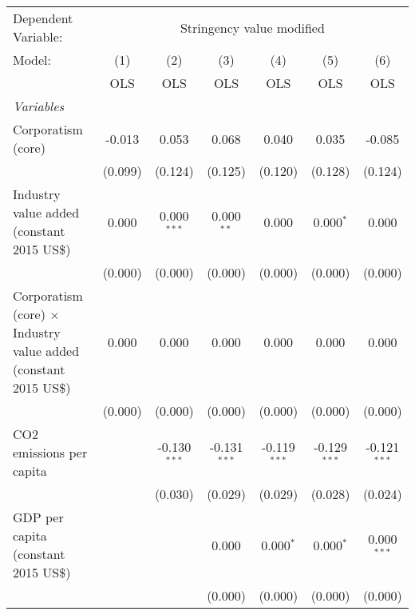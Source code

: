 
\begingroup
\centering
\begin{tabular}{lcccccc}
   \toprule
   Dependent Variable: & \multicolumn{6}{c}{Stringency value modified}\\
   Model:                                                                  & (1)     & (2)            & (3)            & (4)            & (5)            & (6)\\  
                                                                           &  OLS    & OLS            & OLS            & OLS            & OLS            & OLS\\  
   \midrule
   \emph{Variables}\\
   Corporatism (core)                                                      & -0.013  & 0.053          & 0.068          & 0.040          & 0.035          & -0.085\\   
                                                                           & (0.099) & (0.124)        & (0.125)        & (0.120)        & (0.128)        & (0.124)\\   
   Industry value added (constant 2015 US\$)                               & 0.000   & 0.000$^{***}$  & 0.000$^{**}$   & 0.000          & 0.000$^{*}$    & 0.000\\   
                                                                           & (0.000) & (0.000)        & (0.000)        & (0.000)        & (0.000)        & (0.000)\\   
   Corporatism (core) $\times$ Industry value added (constant 2015 US\$)   & 0.000   & 0.000          & 0.000          & 0.000          & 0.000          & 0.000\\   
                                                                           & (0.000) & (0.000)        & (0.000)        & (0.000)        & (0.000)        & (0.000)\\   
   CO2 emissions per capita                                                &         & -0.130$^{***}$ & -0.131$^{***}$ & -0.119$^{***}$ & -0.129$^{***}$ & -0.121$^{***}$\\   
                                                                           &         & (0.030)        & (0.029)        & (0.029)        & (0.028)        & (0.024)\\   
   GDP per capita (constant 2015 US\$)                                     &         &                & 0.000          & 0.000$^{*}$    & 0.000$^{*}$    & 0.000$^{***}$\\   
                                                                           &         &                & (0.000)        & (0.000)        & (0.000)        & (0.000)\\   

\end{tabular}
